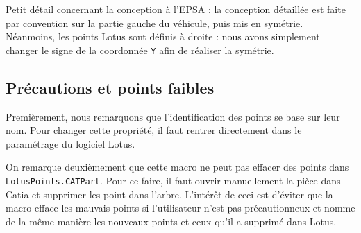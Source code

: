 \par Petit détail concernant la conception à l'EPSA : la conception détaillée est faite par convention sur la partie gauche du véhicule, puis mis en symétrie. Néanmoins, les points Lotus sont définis à droite : nous avons simplement changer le signe de la coordonnée \texttt{Y} afin de réaliser la symétrie.

\subsection{Précautions et points faibles} %

\par Premièrement, nous remarquons que l'identification des points se base sur leur nom. Pour changer cette propriété, il faut rentrer directement dans le paramétrage du logiciel Lotus. \par On remarque deuxièmement que cette macro ne peut pas effacer des points dans\\ \texttt{LotusPoints.CATPart}. Pour ce faire, il faut ouvrir manuellement la pièce dans Catia et supprimer les point dans l'arbre. L'intérêt de ceci est d'éviter que la macro efface les mauvais points si l'utilisateur n'est pas précautionneux et nomme de la même manière les nouveaux  points et ceux qu'il a supprimé dans Lotus.
